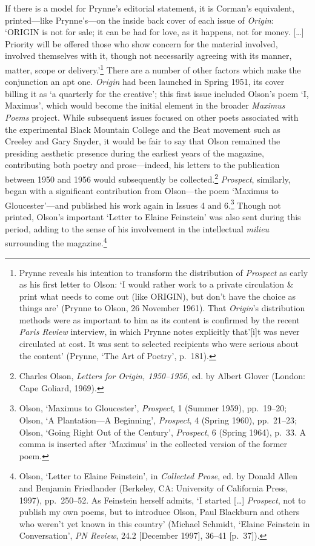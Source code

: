 \documentclass[]{article}
\begin{document}
If there is a model for Prynne's editorial statement, it is Corman's
equivalent, printed---like Prynne's---on the inside back cover of each
issue of \emph{Origin}: `ORIGIN is not for sale; it can be had for love,
as it happens, not for money. {[}\ldots{}{]} Priority will be offered
those who show concern for the material involved, involved themselves
with it, though not necessarily agreeing with its manner, matter, scope
or delivery.'\footnote{Prynne reveals his intention to transform the
  distribution of \emph{Prospect} as early as his first letter to Olson:
  `I would rather work to a private circulation \& print what needs to
  come out (like ORIGIN), but don't have the choice as things are'
  (Prynne to Olson, 26 November 1961). That \emph{Origin}'s distribution
  methods were as important to him as its content is confirmed by the
  recent \emph{Paris Review} interview, in which Prynne notes explicitly
  that'{[}i{]}t was never circulated at cost. It was sent to selected
  recipients who were serious about the content' (Prynne, `The Art of
  Poetry', p.~181).} There are a number of other factors which make the
conjunction an apt one. \emph{Origin} had been launched in Spring 1951,
its cover billing it as `a quarterly for the creative'; this first issue
included Olson's poem `I, Maximus', which would become the initial
element in the broader \emph{Maximus Poems} project. While subsequent
issues focused on other poets associated with the experimental Black
Mountain College and the Beat movement such as Creeley and Gary Snyder,
it would be fair to say that Olson remained the presiding aesthetic
presence during the earliest years of the magazine, contributing both
poetry and prose---indeed, his letters to the publication between 1950
and 1956 would subsequently be collected.\footnote{Charles Olson,
  \emph{Letters for Origin, 1950--1956}, ed. by Albert Glover (London:
  Cape Goliard, 1969).} \emph{Prospect}, similarly, began with a
significant contribution from Olson---the poem `Maximus to
Gloucester'---and published his work again in Issues 4 and 6.\footnote{Olson,
  `Maximus to Gloucester', \emph{Prospect}, 1 (Summer 1959), pp.~19--20;
  Olson, `A Plantation---A Beginning', \emph{Prospect}, 4 (Spring 1960),
  pp.~21--23; Olson, `Going Right Out of the Century', \emph{Prospect},
  6 (Spring 1964), p.~33. A comma is inserted after `Maximus' in the
  collected version of the former poem.} Though not printed, Olson's
important `Letter to Elaine Feinstein' was also sent during this period,
adding to the sense of his involvement in the intellectual \emph{milieu}
surrounding the magazine.\footnote{Olson, `Letter to Elaine Feinstein',
  in \emph{Collected Prose}, ed. by Donald Allen and Benjamin
  Friedlander (Berkeley, CA: University of California Press, 1997),
  pp.~250--52. As Feinstein herself admits, `I started {[}\ldots{}{]}
  \emph{Prospect}, not to publish my own poems, but to introduce Olson,
  Paul Blackburn and others who weren't yet known in this country'
  (Michael Schmidt, `Elaine Feinstein in Conversation', \emph{PN
  Review}, 24.2 {[}December 1997{]}, 36--41 {[}p.~37{]}).}
\end{document}
